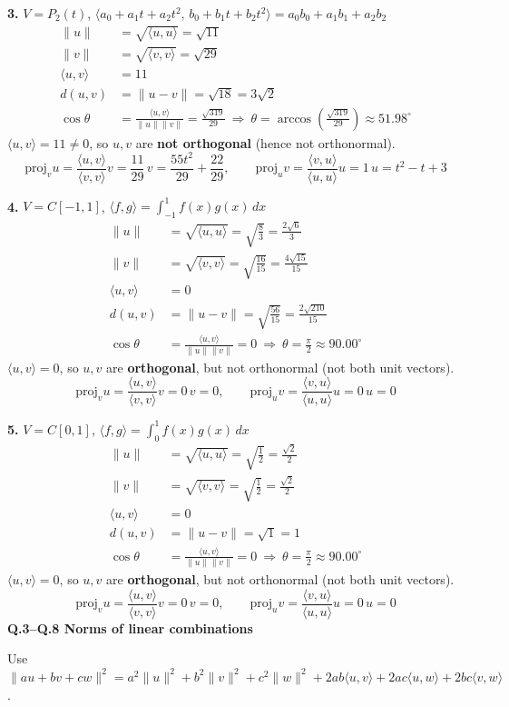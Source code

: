 \noindent\textbf{3.} $V=P_2(t)$, $\langle a_0+a_1t+a_2t^2,\,b_0+b_1t+b_2t^2\rangle=a_0b_0+a_1b_1+a_2b_2$
\begin{align*}
\|u\|&=\sqrt{\langle u,u\rangle}=\sqrt{11} \\
\|v\|&=\sqrt{\langle v,v\rangle}=\sqrt{29} \\
\langle u,v\rangle&=11 \\
d(u,v)&=\|u-v\|=\sqrt{18}=3 \sqrt{2} \\
\cos\theta&=\frac{\langle u,v\rangle}{\|u\|\|v\|}=\frac{\sqrt{319}}{29}\ \Rightarrow\ \theta=\arccos{\left(\frac{\sqrt{319}}{29} \right)}\approx 51.98^\circ
\end{align*}
$\langle u,v\rangle=11\neq0$, so $u,v$ are \textbf{not orthogonal} (hence not orthonormal).
\[ \mathrm{proj}_v u=\frac{\langle u,v\rangle}{\langle v,v\rangle}v=\frac{11}{29}\,v=\frac{55 t^{2}}{29} + \frac{22}{29},\qquad \mathrm{proj}_u v=\frac{\langle v,u\rangle}{\langle u,u\rangle}u=1\,u=t^{2} - t + 3 \]

\noindent\textbf{4.} $V=C[-1,1]$, $\langle f,g\rangle=\int_{-1}^{1}f(x)g(x)\,dx$
\begin{align*}
\|u\|&=\sqrt{\langle u,u\rangle}=\sqrt{\frac{8}{3}}=\frac{2 \sqrt{6}}{3} \\
\|v\|&=\sqrt{\langle v,v\rangle}=\sqrt{\frac{16}{15}}=\frac{4 \sqrt{15}}{15} \\
\langle u,v\rangle&=0 \\
d(u,v)&=\|u-v\|=\sqrt{\frac{56}{15}}=\frac{2 \sqrt{210}}{15} \\
\cos\theta&=\frac{\langle u,v\rangle}{\|u\|\|v\|}=0\ \Rightarrow\ \theta=\frac{\pi}{2}\approx 90.00^\circ
\end{align*}
$\langle u,v\rangle=0$, so $u,v$ are \textbf{orthogonal}, but not orthonormal (not both unit vectors).
\[ \mathrm{proj}_v u=\frac{\langle u,v\rangle}{\langle v,v\rangle}v=0\,v=0,\qquad \mathrm{proj}_u v=\frac{\langle v,u\rangle}{\langle u,u\rangle}u=0\,u=0 \]

\noindent\textbf{5.} $V=C[0,1]$, $\langle f,g\rangle=\int_0^1f(x)g(x)\,dx$
\begin{align*}
\|u\|&=\sqrt{\langle u,u\rangle}=\sqrt{\frac{1}{2}}=\frac{\sqrt{2}}{2} \\
\|v\|&=\sqrt{\langle v,v\rangle}=\sqrt{\frac{1}{2}}=\frac{\sqrt{2}}{2} \\
\langle u,v\rangle&=0 \\
d(u,v)&=\|u-v\|=\sqrt{1}=1 \\
\cos\theta&=\frac{\langle u,v\rangle}{\|u\|\|v\|}=0\ \Rightarrow\ \theta=\frac{\pi}{2}\approx 90.00^\circ
\end{align*}
$\langle u,v\rangle=0$, so $u,v$ are \textbf{orthogonal}, but not orthonormal (not both unit vectors).
\[ \mathrm{proj}_v u=\frac{\langle u,v\rangle}{\langle v,v\rangle}v=0\,v=0,\qquad \mathrm{proj}_u v=\frac{\langle v,u\rangle}{\langle u,u\rangle}u=0\,u=0 \]
\medskip\noindent\textbf{Q.3--Q.8  Norms of linear combinations}\par\smallskip
Use $\|au+bv+cw\|^2=a^2\|u\|^2+b^2\|v\|^2+c^2\|w\|^2+2ab\langle u,v\rangle+2ac\langle u,w\rangle+2bc\langle v,w\rangle$.

